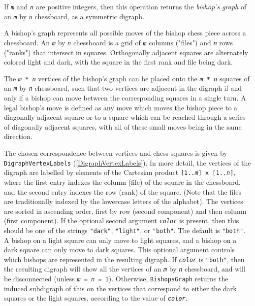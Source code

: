 \documentclass[a4paper,11pt]{report}
\begin{document}
{{{ If \mbox{\texttt{\mdseries\slshape m}} and \mbox{\texttt{\mdseries\slshape n}} are positive integers, then this operation returns the \emph{bishop's graph} of an \mbox{\texttt{\mdseries\slshape m}} by \mbox{\texttt{\mdseries\slshape n}} chessboard, as a symmetric digraph. 

 A bishop's graph represents all possible moves of the bishop chess piece
across a chessboard. An \mbox{\texttt{\mdseries\slshape m}} by \mbox{\texttt{\mdseries\slshape n}} chessboard is a grid of \mbox{\texttt{\mdseries\slshape m}} columns ("files") and \mbox{\texttt{\mdseries\slshape n}} rows ("ranks") that intersect in squares. Orthogonally adjacent squares are
alternately colored light and dark, with the square in the first rank and file
being dark.

 The \texttt{\mbox{\texttt{\mdseries\slshape m}} * \mbox{\texttt{\mdseries\slshape n}}} vertices of the bishop's graph can be placed onto the \texttt{\mbox{\texttt{\mdseries\slshape m}} * \mbox{\texttt{\mdseries\slshape n}}} squares of an \mbox{\texttt{\mdseries\slshape m}} by \mbox{\texttt{\mdseries\slshape n}} chessboard, such that two vertices are adjacent in the digraph if and only if
a bishop can move between the corresponding squares in a single turn. A legal
bishop's move is defined as any move which moves the bishop piece to a
diagonally adjacent square or to a square which can be reached through a
series of diagonally adjacent squares, with all of these small moves being in
the same direction.

 The chosen correspondence between vertices and chess squares is given by \texttt{DigraphVertexLabels} (\ref{DigraphVertexLabels}). In more detail, the vertices of the digraph are labelled by elements of the
Cartesian product \texttt{[1..\mbox{\texttt{\mdseries\slshape m}}] x [1..\mbox{\texttt{\mdseries\slshape n}}]}, where the first entry indexes the column (file) of the square in the
chessboard, and the second entry indexes the row (rank) of the square. (Note
that the files are traditionally indexed by the lowercase letters of the
alphabet). The vertices are sorted in ascending order, first by row (second
component) and then column (first component). If the optional second argument \mbox{\texttt{\mdseries\slshape color}} is present, then this should be one of the strings \texttt{"dark"}, \texttt{"light"}, or \texttt{"both"}. The default is \texttt{"both"}. A bishop on a light square can only move to light squares, and a bishop on a
dark square can only move to dark squares. This optional argument controls
which bishops are represented in the resulting digraph. If \mbox{\texttt{\mdseries\slshape color}} is \texttt{"both"}, then the resulting digraph will show all the vertices of an \mbox{\texttt{\mdseries\slshape m}} by \mbox{\texttt{\mdseries\slshape n}} chessboard, and will be disconnected (unless \texttt{\mbox{\texttt{\mdseries\slshape m}} = \mbox{\texttt{\mdseries\slshape n}} = 1}). Otherwise, \texttt{BishopsGraph} returns the induced subdigraph of this on the vertices that correspond to
either the dark squares or the light squares, according to the value of \mbox{\texttt{\mdseries\slshape color}}. 

}}}
\end{document}
